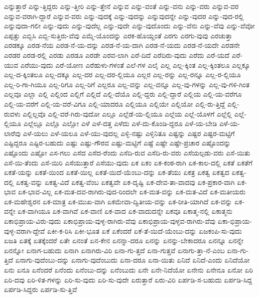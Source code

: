 {ಎನ್ನುತ್ತಾರೆ
ಎನ್ನು-ತ್ತಿದ್ದರು
ಎನ್ನು-ತ್ತೀರಿ
ಎನ್ನು-ತ್ತೇನೆ
ಎನ್ನುವ
ಎನ್ನು-ವಂತೆ
ಎನ್ನು-ವನು
ಎನ್ನು-ವರು
ಎನ್ನುವ-ವರ
ಎನ್ನುವ-ವರಾಗಿ-ದ್ದಾರೆ
ಎನ್ನುವ-ವರು
ಎನ್ನು-ವುದಕ್ಕೆ
ಎನ್ನು-ವುದನ್ನು
ಎನ್ನುವುದನ್ನೇ
ಎನ್ನು-ವುದರ
ಎನ್ನು-ವುದ-ರಲ್ಲಿ
ಎನ್ನುವುದಾ-ಗಲೀ
ಎನ್ನು-ವುದು
ಎನ್ನು-ವುದೆಲ್ಲ
ಎನ್ನು-ವುದೇ
ಎನ್ನು-ವುದೊಂದು
ಎನ್ನು-ವೆನು
ಎನ್ನು-ವೆವು
ಎನ್ನು-ವೆವೋ
ಎಪ್ಪತ್ತು
ಎಬ್ಬಿಸಿ
ಎಬ್ಬಿ-ಸುತ್ತಿರು-ವೆವು
ಎಮ್ಮೆ-ಯೊಂದನ್ನು
ಎರಕ-ಹೊಯ್ದಂತೆ
ಎರಗು
ಎರಗು-ವುವು
ಎರಚುತ್ತಾ
ಎರಡಕ್ಕೂ
ಎರಡ-ನೆಯ
ಎರಡ-ನೆ-ಯ-ದನ್ನು
ಎರಡ-ನೆ-ಯ-ದಾಗಿ
ಎರಡ-ನೆ-ಯದು
ಎರಡ-ನೆ-ಯದೇ
ಎರಡನೇ
ಎರಡರ
ಎರಡ-ರಲ್ಲಿ
ಎರಡು
ಎರಡೂ
ಎರಡೇ
ಎರವ-ಲಾಗಿ
ಎರೆ-ದಿದೆ
ಎರೆದಿರು-ವುದು
ಎರೆದು
ಎರೆ-ಯದೆ
ಎರೆ-ಯುವ
ಎರೆಯು-ವುದು
ಎರೆ-ಯೋಣ
ಎರೆಹುಳು-ಗಳಂತೆ
ಎಲೆ-ಗಳ
ಎಲೈ
ಎಲ್ಲ
ಎಲ್ಲ-ಕ್ಕಿಂತ
ಎಲ್ಲ-ಕ್ಕಿಂತಲೂ
ಎಲ್ಲಕ್ಕೂ
ಎಲ್ಲ-ದ-ಕ್ಕಿಂತಲೂ
ಎಲ್ಲ-ದಕ್ಕೂ
ಎಲ್ಲ-ದರ
ಎಲ್ಲ-ದರ-ಲ್ಲಿಯೂ
ಎಲ್ಲರ
ಎಲ್ಲ-ರನ್ನು
ಎಲ್ಲ-ರನ್ನೂ
ಎಲ್ಲ-ರ-ಲ್ಲಿಯೂ
ಎಲ್ಲ-ರಿ-ಗಾ-ಗಿಯೂ
ಎಲ್ಲ-ರಿಗೂ
ಎಲ್ಲ-ರಿಗೆ
ಎಲ್ಲರೂ
ಎಲ್ಲ-ವನ್ನು
ಎಲ್ಲ-ವನ್ನೂ
ಎಲ್ಲ-ವು-ಗಳನ್ನು
ಎಲ್ಲ-ವು-ಗಳಿ-ಗಿಂತ
ಎಲ್ಲವೂ
ಎಲ್ಲಾ
ಎಲ್ಲಿ
ಎಲ್ಲಿಂದ
ಎಲ್ಲಿಗೆ
ಎಲ್ಲಿದೆ
ಎಲ್ಲಿ-ದೆಯೊ
ಎಲ್ಲಿ-ದ್ದರು
ಎಲ್ಲಿ-ದ್ದಾರೆ
ಎಲ್ಲಿಯ
ಎಲ್ಲಿ-ಯ-ವರೆಗೂ
ಎಲ್ಲಿ-ಯ-ವರೆಗೆ
ಎಲ್ಲಿ-ಯ-ವರೆ-ವಿಗೂ
ಎಲ್ಲಿ-ಯಾದರೂ
ಎಲ್ಲಿಯೂ
ಎಲ್ಲಿಯೇ
ಎಲ್ಲಿಯೋ
ಎಲ್ಲಿ-ರು-ತ್ತಿದ್ದೆ
ಎಲ್ಲಿ-ರುವಳು
ಎಲ್ಲಿಲ್ಲವೊ
ಎಲ್ಲಿ-ವರೆ-ಗಿರು-ವುದೋ
ಎಲ್ಲೂ
ಎಲ್ಲೆಡೆ-ಯ-ಲ್ಲಿಯೂ
ಎಲ್ಲೆಯ
ಎಲ್ಲೆ-ಯೊಳಗೆ
ಎಲ್ಲೆಲ್ಲಿ
ಎಲ್ಲೆ-ಲ್ಲಿಯೂ
ಎಲ್ಲೆಲ್ಲೂ
ಎಲ್ಲೊ
ಎಲ್ಲೋ
ಎಳೆ
ಎಳೆ-ದತ್ತ
ಎಳೆದು
ಎಳೆ-ದು-ಕೊಂಡಿ-ದ್ದರೂ
ಎಳೆ-ಯ-ಬೇಡಿ
ಎಳೆ-ಯ-ಲಾರೆವು
ಎಳೆ-ಯಲು
ಎಳೆ-ಯಲೂ
ಎಳೆ-ಯು-ವುದಲ್ಲ
ಎಳ್ಳಿ-ನಷ್ಟು
ಎಳ್ಳಿನಿತೂ
ಎಷ್ಟನ್ನು
ಎಷ್ಟರ
ಎಷ್ಟರ-ಮಟ್ಟಿಗೆ
ಎಷ್ಟಿದ್ದರೂ
ಎಷ್ಟಿರ-ಬಹುದು
ಎಷ್ಟು
ಎಷ್ಟು-ಗೌರವ
ಎಷ್ಟು-ಮಟ್ಟಿಗೆ
ಎಷ್ಟೆ
ಎಷ್ಟೇ
ಎಷ್ಟೇ-ಪ್ರಚಾರ
ಎಷ್ಟೊಂದನ್ನು
ಎಷ್ಟೊಂದು
ಎಷ್ಟೋ
ಎಸ-ಗಲು
ಎಸೆದ
ಎಸೆದ-ರೆಂದು
ಎಸೆದಿ-ರುವ
ಎಸೆದಿ-ರು-ವರು
ಎಸೆಯಲ್ಪಡು-ವರು
ಎಸೆ-ಯಿತು
ಎಸೆ-ಯಿ-ತೆಂದು
ಎಸೆ-ಯಿರಿ
ಎಸೆಯುತ್ತಾರೆ
ಎಸೆಯು-ವುದು
ಏಕ
ಏಕಂ
ಏಕ-ಕಂಠ-ರಾಗಿ
ಏಕ-ಕಾಲ-ದಲ್ಲಿ
ಏಕತೆ
ಏಕತೆಗೆ
ಏಕತೆ-ಯನ್ನು
ಏಕತೆ-ಯಿಂದ
ಏಕತೆ-ಯಿಲ್ಲ
ಏಕತೆ-ಯಿದೆ-ಯೆಂಬು-ದನ್ನು
ಏಕ-ತೆಯು
ಏಕತ್ರ
ಏಕತ್ವ
ಏಕತ್ವದ
ಏಕತ್ವ-ದಲ್ಲಿ
ಏಕತ್ವ-ವನ್ನು
ಏಕತ್ವ-ವಿದೆ
ಏಕತ್ವ-ವೆಂಬ
ಏಕತ್ವವೇ
ಏಕ-ದೃಷ್ಟಿ
ಏಕ-ದೇವ-ತಾ-ವಾದವು
ಏಕ-ಪ್ರಕಾರ-ವಾಗಿ
ಏಕ-ಭಾವ
ಏಕ-ಭಾವ-ವಿಲ್ಲ
ಏಕ-ಮತ-ದವ-ರಾಗಿರು-ವುದ-ರಿಂದಲೇ
ಏಕ-ಮತ-ವನ್ನು
ಏಕ-ಮತ-ವಿದೆ
ಏಕ-ಮತೀಯರು
ಏಕ-ಮಹೇಶ್ವರನ
ಏಕ-ಮಾತ್ರ
ಏಕ-ಮುಖ-ವಾಗಿ
ಏಕಮೇವಾ-ದ್ವಿತೀಯ-ವನ್ನು
ಏಕ-ರೀತಿ-ಯಾಗಿದೆ
ಏಕ-ವನ್ನು
ಏಕ-ವನ್ನೇ
ಏಕ-ವಾಗಿಯೂ
ಏಕ-ವಾಗಿವೆ
ಏಕ-ವಾಣಿ
ಏಕ-ವಾದ
ಏಕ-ವಾದುದನ್ನೇ
ಏಕವೂ
ಏಕಾತ್ಮ-ನಲ್ಲಿ
ಏಕಾತ್ಮನು
ಏಕಾಭಿಪ್ರಾಯ-ವಿರು-ವುದು
ಏಕಾಭಿಪ್ರಾಯ-ವುಳ್ಳ-ರಾಗಿರು-ವೆವು
ಏಕಾಭಿಪ್ರಾಯ-ವುಳ್ಳವ-ರಾಗಿರು-ವೆವು
ಏಕಾ-ಭಿಪ್ರಾಯ-ವುಳ್ಳ-ವರಾಗಿ-ದ್ದೇವೆ
ಏಕೀ-ಕ-ರಿಸಿ
ಏಕೀ-ಭೂತ
ಏಕೆ
ಏಕೆಂದರೆ
ಏಕೆ-ತೆ-ಯಿದೆ-ಯೆಂಬು-ದನ್ನು
ಏಜಕಂಪಿ-ಸು-ವುದು
ಏಜತಿ
ಏತಕ್ಕೆ
ಏತಕ್ಕೆಂದರೆ
ಏತೇ
ಏನಂತೆ
ಏನ-ಕೇನ
ಏನನ್ನಾ-ದರೂ
ಏನನ್ನು
ಏನನ್ನು-ಬೇಕಾದರೂ
ಏನನ್ನೂ
ಏನನ್ನೇ
ಏನನ್ನೋ
ಏನಾಗ-ಬಹುದು
ಏನಾಗಿ
ಏನಾಗಿರು-ವಿರಿ
ಏನಾ-ಗು-ತ್ತದೆ
ಏನಾ-ಗುತ್ತವೆ
ಏನಾಗು-ತ್ತಾ-ನೆ-ಎಂಬ
ಏನಾ-ಗು-ತ್ತಿದೆ
ಏನಾಗು-ವುದೆಂಬು-ದನ್ನು
ಏನಾಗು-ವುದೆಂಬುದು
ಏನಾ-ದರೂ
ಏನಾ-ಯಿತು
ಏನಿದೆ
ಏನಿದೆ-ಎಂದು
ಏನಿದೆಯೋ
ಏನು
ಏನೂ
ಏನೆಂದರೆ
ಏನೆಂದು
ಏನೆಂಬು-ದನ್ನು
ಏನೆಂಬುದು
ಏನೇ
ಏನೇ-ನಿದೆಯೋ
ಏನೇನು
ಏನೇನೂ
ಏನೋ
ಏರಿ
ಏರಿ-ದವು
ಏರಿ-ಳಿತ-ಗಳನ್ನು
ಏರಿ-ಸು-ವುದು
ಏರಿ-ಸು-ವುದೇ
ಏರುತ್ತಾರೆ
ಏರು-ವಿರಿ
ಏರ್ಪಡಿ-ಸ-ಬಹುದು
ಏರ್ಪಡಿ-ಸಿದ್ದ
ಏರ್ಪಡಿ-ಸಿದ್ದರು
ಏರ್ಪಡಿ-ಸು-ತ್ತಿವೆ
}

